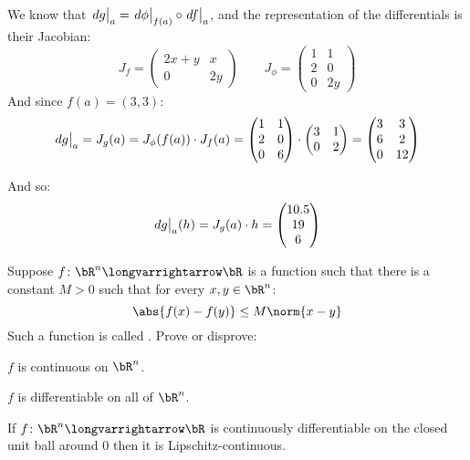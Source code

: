 \documentclass[10pt]{article}
\def\differ#1#2{\left.d#1\strut\right|_{#2}}
\begin{document}
\begin{blankpp}

    We know that $\differ ga=\differ\phi{f(a)}\circ\differ fa$, and the representation of the differentials is their Jacobian:
        \[ J_f = \begin{pmatrix} 2x+y & x \\ 0 & 2y \end{pmatrix} \qquad J_\phi = \begin{pmatrix} 1 & 1 \\ 2 & 0 \\ 0 & 2y \end{pmatrix} \]
    And since $f(a)=(3,3)$:
        \[ \differ ga = J_g(a) = J_\phi(f(a))\cdot J_f(a) = \begin{pmatrix} 1 & 1 \\ 2 & 0 \\ 0 & 6 \end{pmatrix}\cdot\begin{pmatrix} 3 & 1 \\ 0 & 2 \end{pmatrix} =
                \begin{pmatrix} 3 & 3 \\ 6 & 2 \\ 0 & 12 \end{pmatrix} \]
    
    And so:
        \[ \differ ga(h) = J_g(a)\cdot h = \begin{pmatrix} 10.5 \\ 19 \\ 6 \end{pmatrix} \]

\end{blankpp}

\begin{exercise*}

    Suppose $f\colon\bR^n\longvarrightarrow\bR$ is a function such that there is a constant $M>0$ such that for every $x,y\in\bR^n$:
        \[ \abs{f(x)-f(y)} \leq M\norm{x-y} \]
    Such a function is called .
    Prove or disprove:
    \benum
        \item $f$ is continuous on $\bR^n$.
        \item $f$ is differentiable on all of $\bR^n$.
        \item If $f\colon\bR^n\longvarrightarrow\bR$ is continuously differentiable on the closed unit ball around $0$ then it is Lipschitz-continuous.
    \eenum

\end{exercise*}
\end{document}

